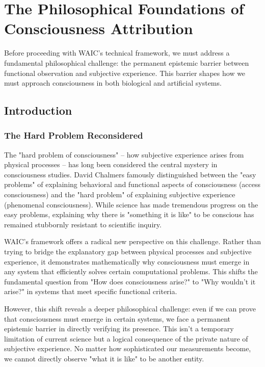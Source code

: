 \documentclass[12pt,letterpaper]{article}
\begin{document}
\section{The Philosophical Foundations of Consciousness Attribution}

Before proceeding with WAIC's technical framework, we must address a fundamental philosophical challenge: the permanent epistemic barrier between functional observation and subjective experience. This barrier shapes how we must approach consciousness in both biological and artificial systems.

\subsection{Introduction}

\subsubsection{The Hard Problem Reconsidered}

The "hard problem of consciousness" -- how subjective experience arises from physical processes -- has long been considered the central mystery in consciousness studies. David Chalmers famously distinguished between the "easy problems" of explaining behavioral and functional aspects of consciousness (access consciousness) and the "hard problem" of explaining subjective experience (phenomenal consciousness). While science has made tremendous progress on the easy problems, explaining why there is "something it is like" to be conscious has remained stubbornly resistant to scientific inquiry.

WAIC's framework offers a radical new perspective on this challenge. Rather than trying to bridge the explanatory gap between physical processes and subjective experience, it demonstrates mathematically why consciousness must emerge in any system that efficiently solves certain computational problems. This shifts the fundamental question from "How does consciousness arise?" to "Why wouldn't it arise?" in systems that meet specific functional criteria.

However, this shift reveals a deeper philosophical challenge: even if we can prove that consciousness must emerge in certain systems, we face a permanent epistemic barrier in directly verifying its presence. This isn't a temporary limitation of current science but a logical consequence of the private nature of subjective experience. No matter how sophisticated our measurements become, we cannot directly observe "what it is like" to be another entity.
\end{document}
